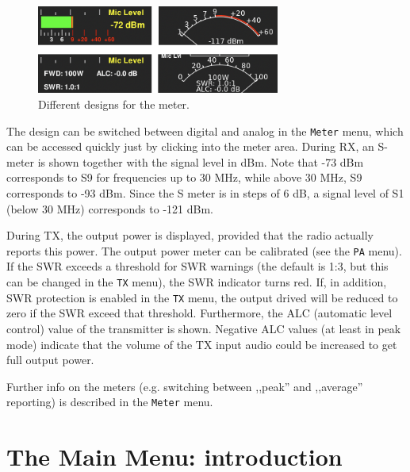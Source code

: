 \documentclass[12pt]{book}
\def\bltt#1{\texttt{\color{blue}#1}}
\begin{document}
\begin{figure}[ht]
\center
\includegraphics[width=8cm]{MeterDesigns.png}
\caption{Different designs for the meter.}
\label{fig:MeterDesigns}
\end{figure}

The design can be switched between digital and analog in the \bltt{Meter}
menu, which can be accessed quickly just by clicking into the meter area.
During RX, an S-meter is shown together with the signal level in dBm. Note
that -73 dBm corresponds to S9 for frequencies up to 30 MHz, while above
30 MHz, S9 corresponds to -93 dBm. Since the S meter is in steps of
6 dB, a signal level of S1 (below 30 MHz) corresponds to -121 dBm.

During TX, the output power is displayed, provided that the radio actually
reports this power. The output power meter can be calibrated (see the \bltt{PA}
menu). If the SWR exceeds a threshold for SWR warnings (the default is 1:3, but
this can be changed in the \bltt{TX} menu), the SWR indicator turns red. If,
in addition, SWR protection is enabled in the \bltt{TX} menu, the output
drived  will be reduced to zero if the SWR exceed that threshold.
Furthermore, the ALC (automatic level control) value of the transmitter is
shown. Negative ALC values (at least in peak mode) indicate that the volume of the TX input audio
could be increased to get full output  power.

Further info on the meters (e.g. switching between ,,peak'' and ,,average'' reporting)
is described in the \bltt{Meter} menu.

\chapter{The Main Menu: introduction}
\end{document}
